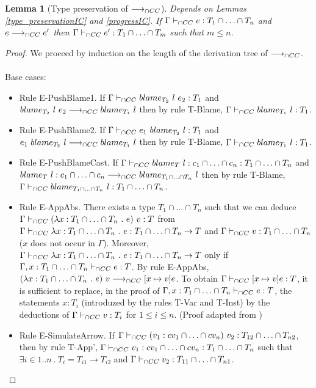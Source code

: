 \documentclass[a4paper]{article}
\newtheorem{lemma}{Lemma}
\begin{document}
\begin{lemma}[Type preservation of $\longrightarrow_{\cap CC}$]
\label{type_preservation}
Depends on Lemmas \ref{type_preservationIC} and \ref{progressIC}.
If $\Gamma \vdash_{\cap CC} e : T_1 \cap \ldots \cap T_n$ and $e \longrightarrow_{\cap CC} e'$ then $\Gamma \vdash_{\cap CC} e' : T_1 \cap \ldots \cap T_m$ such that $m \leq n$.
\end{lemma}
\begin{proof}
We proceed by induction on the length of the derivation tree of $\longrightarrow_{\cap CC}$.\\\\
Base cases:
\begin{itemize}
    \item Rule E-PushBlame1.
    If $\Gamma \vdash_{\cap CC} blame_{T_2}\ l\ e_2 : T_1$ and $blame_{T_2}\ l\ e_2 \longrightarrow_{\cap CC} blame_{T_1}\ l$ then by rule T-Blame, $\Gamma \vdash_{\cap CC} blame_{T_1}\ l : T_1$.
    \item Rule E-PushBlame2.
    If $\Gamma \vdash_{\cap CC} e_1\ blame_{T_2}\ l : T_1$ and $e_1\ \blame{T_2}{l} \gios \blame{T_1}{l}$ then by rule T-Blame, $\Gamma \vdash_{\cap CC} blame_{T_1}\ l : T_1$.
    \item Rule E-PushBlameCast.
    If $\Gamma \vdash_{\cap CC} blame_{T}\ l : c_1 \cap \ldots \cap c_n : T_1 \cap \ldots \cap T_n$ and $blame_{T}\ l : c_1 \cap \ldots \cap c_n \longrightarrow_{\cap CC} blame_{T_1 \cap \ldots \cap T_n}\ l$ then by rule T-Blame, $\Gamma \vdash_{\cap CC} blame_{T_1 \cap \ldots \cap T_n}\ l : T_1 \cap \ldots \cap T_n$.
    \item Rule E-AppAbs.
    There exists a type $T_1 \cap \ldots \cap T_n$ such that we can deduce $\Gamma \vdash_{\cap CC} (\lambda x : T_1 \cap \ldots \cap T_n\ .\ e)\ v : T$ from $\Gamma \iccts \lambda x : T_1 \cap \ldots \cap T_n\ .\ e : T_1 \cap \ldots \cap T_n \rightarrow T$ and $\Gamma \vdash_{\cap CC} v : T_1 \cap \ldots \cap T_n$ ($x$ does not occur in $\Gamma$).
    Moreover, $\Gamma \iccts \lambda x : T_1 \cap \ldots \cap T_n\ .\ e : T_1 \cap \ldots \cap T_n \rightarrow T$ only if $\Gamma, x : T_1 \cap \ldots \cap T_n \vdash_{\cap CC} e : T$.
    By rule E-AppAbs, $(\lambda x : T_1 \cap \ldots \cap T_n\ .\ e)\ v \longrightarrow_{\cap CC} [x \mapsto v] e$.
    To obtain $\Gamma \vdash_{\cap CC} [x \mapsto v] e : T$, it is sufficient to replace, in the proof of $\Gamma, x : T_1 \cap \ldots \cap T_n \vdash_{\cap CC} e : T$, the statements $x : T_i$ (introduzed by the rules T-Var and T-Inst) by the deductions of $\Gamma \vdash_{\cap CC} v : T_i$ for $1 \leq i \leq n$.
    (Proof adapted from \cite{coppo1980extension})
    \item Rule E-SimulateArrow.
    If $\Gamma \vdash_{\cap CC} (v_1 : cv_1 \cap \ldots \cap cv_n)\ v_2 : T_{12} \cap \ldots \cap T_{n2}$, then by rule T-App', $\Gamma \vdash_{\cap CC} v_1 : cv_1 \cap \ldots \cap cv_n : T_1 \cap \ldots \cap T_n$ such that $\exists i \in 1 .. n\ .\ T_i = T_{i1} \rightarrow T_{i2}$ and $\Gamma \vdash_{\cap CC} v_2 : T_{11} \cap \ldots \cap T_{n1}$.

\end{itemize}
\end{proof}
\end{document}
